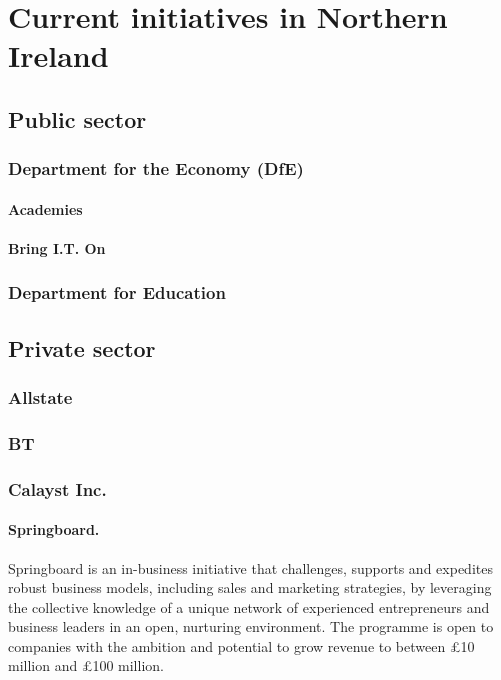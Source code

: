 \section{Current initiatives in Northern Ireland}

\subsection{Public sector}

\subsubsection{Department for the Economy (DfE)}

\paragraph{Academies}

\paragraph{Bring I.T. On}

\subsubsection{Department for Education}

\subsection{Private sector}

\subsubsection{Allstate}

\subsubsection{BT}

\subsubsection{Calayst Inc.}

\paragraph{Springboard.} Springboard is an in-business initiative that challenges, supports and expedites robust business models, including sales and marketing strategies, by leveraging the collective knowledge of a unique network of experienced entrepreneurs and business leaders in an open, nurturing environment. The programme is open to companies with the ambition and potential to grow revenue to between \pounds 10 million and \pounds 100 million.


